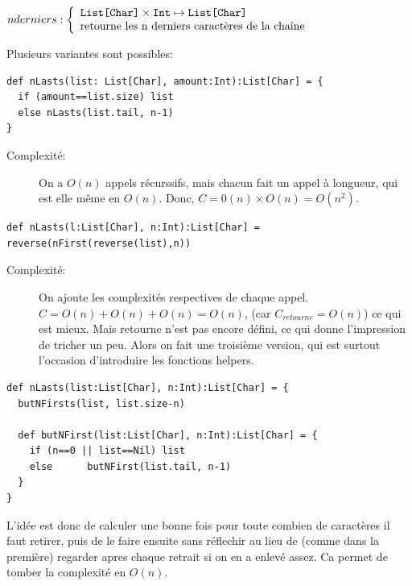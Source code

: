 \documentclass[10pt]{article}\usepackage[correction,nu]{esial}
\begin{document}
\begin{Question}
  $nderniers: \left\{
    \begin{array}{l}
      \text{\texttt{List[Char]}}\times\text{\texttt{Int}}\mapsto \text{\texttt{List[Char]}}\\
      \text{retourne les n derniers caractères de la chaîne}
    \end{array}\right.$  
\end{Question}
\begin{Reponse}
  Plusieurs variantes sont possibles:
  \begin{Verbatim}[label=version naive]
def nLasts(list: List[Char], amount:Int):List[Char] = {
  if (amount==list.size) list
  else nLasts(list.tail, n-1)
}    
  \end{Verbatim}
  \begin{description}
  \item[Complexité:] On a $O(n)$ appels récurssifs, mais chacun fait un appel à
    longueur, qui est elle même en $O(n)$. Donc, $C=0(n)\times
    O(n)=O(n^2)$. 
  \end{description}

  \begin{Verbatim}[label=avec retourne]
def nLasts(l:List[Char], n:Int):List[Char] = reverse(nFirst(reverse(list),n))
  \end{Verbatim}
  \begin{description}
  \item[Complexité:] On ajoute les complexités respectives de chaque appel. $C =
    O(n) + O(n) + O(n) = O(n)$, (car $C_{retourne}=O(n)$) ce qui est mieux. Mais
    retourne n'est pas encore défini, ce qui donne l'impression de tricher un
    peu. Alors on fait une troisième version, qui est surtout l'occasion
    d'introduire les fonctions helpers.
  \end{description}

  \begin{Verbatim}[label=avec fonction d'aide]
def nLasts(list:List[Char], n:Int):List[Char] = {
  butNFirsts(list, list.size-n) 

  def butNFirst(list:List[Char], n:Int):List[Char] = {
    if (n==0 || list==Nil) list
    else      butNFirst(list.tail, n-1)
  }
}
  \end{Verbatim}

  L'idée est donc de calculer une bonne fois pour toute combien de caractères
  il faut retirer, puis de le faire ensuite sans réflechir au lieu de (comme
  dans la première) regarder apres chaque retrait si on en a enlevé assez. Ca
  permet de tomber la complexité en $O(n)$.
\end{Reponse}
\end{document}
